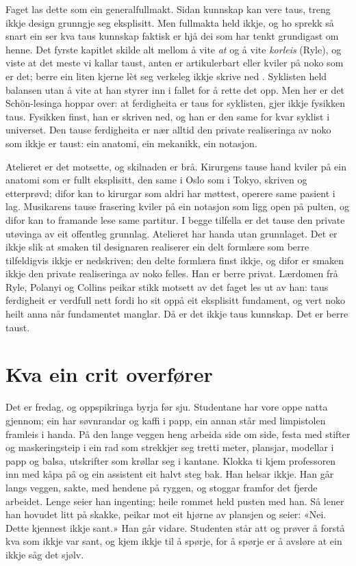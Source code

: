 Faget las dette som ein generalfullmakt. Sidan kunnskap kan vere taus, treng ikkje design grunngje seg eksplisitt. Men fullmakta held ikkje, og ho sprekk så snart ein ser kva taus kunnskap faktisk er hjå dei som har tenkt grundigast om henne. Det fyrste kapitlet skilde alt mellom å vite \emph{at} og å vite \emph{korleis} (Ryle), og viste at det meste vi kallar taust, anten er artikulerbart eller kviler på noko som er det; berre ein liten kjerne lèt seg verkeleg ikkje skrive ned \autocite{ryle1949mind,collins2010tacit}. Syklisten held balansen utan å vite at han styrer inn i fallet for å rette det opp. Men her er det Schön-lesinga hoppar over: at ferdigheita er taus for syklisten, gjer ikkje fysikken taus. Fysikken finst, han er skriven ned, og han er den same for kvar syklist i universet. Den tause ferdigheita er nær alltid den private realiseringa av noko som ikkje er taust: ein anatomi, ein mekanikk, ein notasjon.

Atelieret er det motsette, og skilnaden er brå. Kirurgens tause hand kviler på ein anatomi som er fullt eksplisitt, den same i Oslo som i Tokyo, skriven og etterprøvd; difor kan to kirurgar som aldri har møttest, operere same pasient i lag. Musikarens tause frasering kviler på ein notasjon som ligg open på pulten, og difor kan to framande lese same partitur. I begge tilfella er det tause den private utøvinga av eit offentleg grunnlag. Atelieret har handa utan grunnlaget. Det er ikkje slik at smaken til designaren realiserer ein delt formlære som berre tilfeldigvis ikkje er nedskriven; den delte formlæra finst ikkje, og difor er smaken ikkje den private realiseringa av noko felles. Han er berre privat. Lærdomen frå Ryle, Polanyi og Collins peikar stikk motsett av det faget les ut av han: taus ferdigheit er verdfull nett fordi ho sit oppå eit eksplisitt fundament, og vert noko heilt anna når fundamentet manglar. Då er det ikkje taus kunnskap. Det er berre taust.

\section{Kva ein crit overfører}

Det er fredag, og oppspikringa byrja før sju. Studentane har vore oppe natta gjennom; ein har søvnrandar og kaffi i papp, ein annan står med limpistolen framleis i handa. På den lange veggen heng arbeida side om side, festa med stifter og maskeringsteip i ein rad som strekkjer seg tretti meter, plansjar, modellar i papp og balsa, utskrifter som krøllar seg i kantane. Klokka ti kjem professoren inn med kåpa på og ein assistent eit halvt steg bak. Han helsar ikkje. Han går langs veggen, sakte, med hendene på ryggen, og stoggar framfor det fjerde arbeidet. Lenge seier han ingenting; heile rommet held pusten med han. Så lener han hovudet litt på skakke, peikar mot eit hjørne av plansjen og seier: «Nei. Dette kjennest ikkje sant.» Han går vidare. Studenten står att og prøver å forstå kva som ikkje var sant, og kjem ikkje til å spørje, for å spørje er å avsløre at ein ikkje såg det sjølv.

